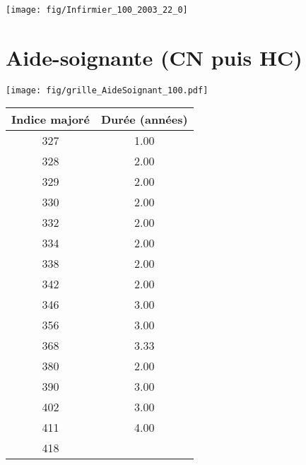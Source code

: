  \vspace{0.1cm} 

 {\hspace{-2.2cm}\texttt{[image: fig/Infirmier\_100\_2003\_22\_0]}} 

\newpage 
 
\chapter{Aide-soignante (CN puis HC)} 

\begin{minipage}{0.55\linewidth}\texttt{[image: fig/grille\_AideSoignant\_100.pdf]}\end{minipage} 
\begin{minipage}{0.3\linewidth} 
 \begin{center} 

\begin{tabular}[htb]{|c|c|} 
\hline 
 Indice majoré &  Durée (années) \\ 
\hline \hline 
 327 &  1.00 \\ 
\hline 
 328 &  2.00 \\ 
\hline 
 329 &  2.00 \\ 
\hline 
 330 &  2.00 \\ 
\hline 
 332 &  2.00 \\ 
\hline 
 334 &  2.00 \\ 
\hline 
 338 &  2.00 \\ 
\hline 
 342 &  2.00 \\ 
\hline 
 346 &  3.00 \\ 
\hline 
 356 &  3.00 \\ 
\hline 
 368 &  3.33 \\ 
\hline 
 380 &  2.00 \\ 
\hline 
 390 &  3.00 \\ 
\hline 
 402 &  3.00 \\ 
\hline 
 411 &  4.00 \\ 
\hline 
 418 &   \\ 
\hline 
\hline 
\end{tabular} 
\end{center} 
 \end{minipage} 

~\\ 
 


   
 \localtableofcontents 

